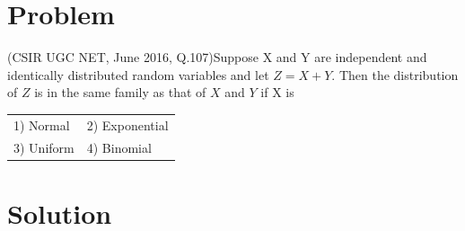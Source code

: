 \documentclass[journal,12pt,twocolumn]{IEEEtran}
\begin{document}
\section{Problem}
(CSIR UGC NET, June 2016, Q.107)Suppose X and Y are independent and identically distributed random variables and let $Z = X + Y$. Then the distribution of $Z$ is in the same family as that of $X$ and $Y$ if X is
\begin{table}[h]
\setlength{\tabcolsep}{30pt}
    \begin{tabular}{ll}
         1) Normal  & 2) Exponential  \\
         3) Uniform & 4) Binomial
    \end{tabular}
\end{table}
\section{Solution}
\end{document}
